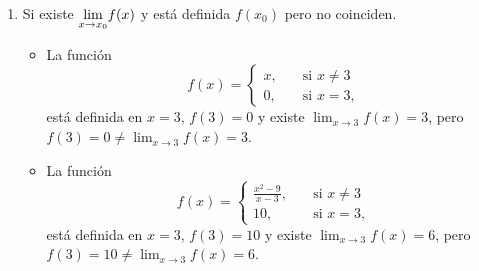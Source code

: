 \begin{enumerate}
    \item Si existe $\displaystyle{\ensuremath{\lim_{x\to x_0}}} f(x)$ y está definida $f(x_0)$ pero no coinciden.
    \begin{itemize}
        \item  La función 
    \[
    f(x) = \begin{cases} x, \quad&\text{si $x\neq 3$}\\
    0, \quad&\text{si $x=3$},
    \end{cases}
    \]
    está definida en $x=3$, $f(3)=0$ y existe $\lim_{x\to3}f(x) = 3$, 
    pero $f(3)=0\neq \lim_{x\to3}f(x) = 3$.
        \item  La función 
    \[
    f(x) = \begin{cases} \frac{x^2-9}{x-3}, \quad&\text{si $x\neq 3$}\\
    10, \quad&\text{si $x=3$},
    \end{cases}
    \]
    está definida en $x=3$, $f(3)=10$ y existe $\lim_{x\to3}f(x) = 6$, 
    pero $f(3)=10\neq \lim_{x\to3}f(x) = 6$.
    \end{itemize}
\end{enumerate}



